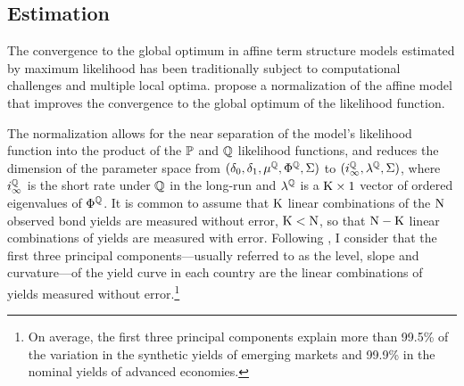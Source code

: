 {%
%


\subsection{Estimation} \label{sec:Estimation}
\iftoggle{toclinks}{\gototoc}{} %
The convergence to the global optimum in affine term structure models estimated by maximum likelihood has been traditionally subject to computational challenges and multiple local optima.
\cite{JSZ:2011} propose a normalization of the affine model that improves the convergence to the global optimum of the likelihood function.

The \cite{JSZ:2011} normalization allows for the near separation of the model's likelihood function into the product of the \(\mathbb{P}\) and \(\mathbb{Q}\) likelihood functions, and reduces the dimension of the parameter space from \((\delta_{0}, \delta_{1}, \mu^{\mathbb{Q}}, \Phi^{\mathbb{Q}}, \Sigma)\) to \((i^{\mathbb{Q}}_{\infty}, \lambda^{\mathbb{Q}},\Sigma)\), where \(i^{\mathbb{Q}}_{\infty}\) is the short rate under \(\mathbb{Q}\) in the long-run and \(\lambda^{\mathbb{Q}}\) is a \(\mathrm{K} \times 1\) vector of ordered eigenvalues of \(\Phi^{\mathbb{Q}}\).
It is common to assume that \(\mathrm{K}\) linear combinations of the \(\mathrm{N}\) observed bond yields are measured without error, \(\mathrm{K} < \mathrm{N}\), so that \(\mathrm{N} - \mathrm{K}\) linear combinations of yields are measured with error. 
Following \cite{JSZ:2011}, I consider that the first three principal components---usually referred to as the level, slope and curvature---of the yield curve in each country are the linear combinations of yields measured without error.\footnote{ On average, the first three principal components explain more than 99.5\% of the variation in the synthetic yields of emerging markets and 99.9\% in the nominal yields of advanced economies.} %
%	
%	

}
